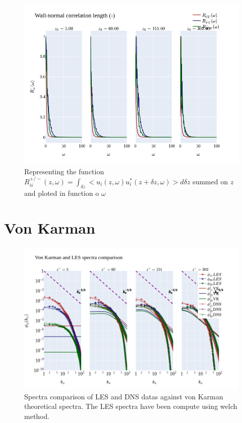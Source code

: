 \documentclass[]{article}
\theoremstyle{plain}
\theoremstyle{remark}
\begin{document}
\begin{figure}[H]
	\begin{center}
		\includegraphics[width=\textwidth]{../../output/figures/channel_wrles_retau395/split_time/Normal_plan/correlation_length_minus.png}
		\caption{Representing the function $R_{ii}^{+/-}(z,\omega)=\int_{\delta z}<u_i(z,\omega)u_i^*(z+\delta z, \omega)>d\delta z$ summed on $z$ and ploted in function o $\omega$}
	\end{center}
\end{figure}


\section{Von Karman}


\begin{figure}[H]
	\begin{center}
		\includegraphics[width=\textwidth]{../../output/figures/channel_wrles_retau395/split_time/von_karman/von_karman_spectra.png}
		\caption{Spectra comparison of LES and DNS datas against von Karman theoretical spectra. The LES spectra have been compute using welch method.}
	\end{center}
\end{figure}
\end{document}
